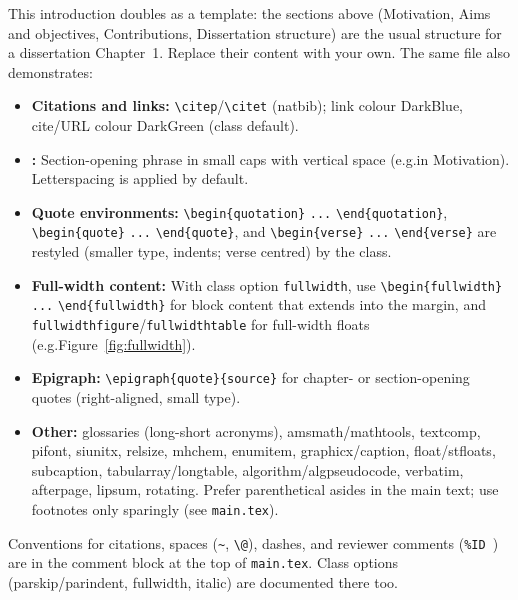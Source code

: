     This introduction doubles as a template: the sections above (Motivation, Aims and objectives, Contributions, Dissertation structure) are the usual structure for a dissertation Chapter~1. Replace their content with your own. The same file also demonstrates:

    \begin{itemize}
        \item \textbf{Citations and links:} \verb|\citep|/\verb|\citet| (natbib); link colour DarkBlue, cite/URL colour DarkGreen (class default).
      \item \textbf{\texttt{\string\newthought}:} Section-opening phrase in small caps with vertical space (e.g.\@ in Motivation). Letterspacing is applied by default.
        \item \textbf{Quote environments:} \verb|\begin{quotation}| \verb|...| \verb|\end{quotation}|, \verb|\begin{quote}| \verb|...| \verb|\end{quote}|, and \verb|\begin{verse}| \verb|...| \verb|\end{verse}| are restyled (smaller type, indents; verse centred) by the class.
        \item \textbf{Full-width content:} With class option \texttt{fullwidth}, use \verb|\begin{fullwidth}| \verb|...| \verb|\end{fullwidth}| for block content that extends into the margin, and \texttt{fullwidthfigure}/\texttt{fullwidthtable} for full-width floats (e.g.\@ Figure~\ref{fig:fullwidth}).
        \item \textbf{Epigraph:} \verb|\epigraph{quote}{source}| for chapter- or section-opening quotes (right-aligned, small type).
      \item \textbf{Other:} glossaries (long-short acronyms), amsmath/mathtools, textcomp, pifont, siunitx, relsize, mhchem, enumitem, graphicx/caption, float/stfloats, subcaption, tabularray/longtable, algorithm/algpseudocode, verbatim, afterpage, lipsum, rotating. Prefer parenthetical asides in the main text; use footnotes only sparingly (see \texttt{main.tex}).
    \end{itemize}

    Conventions for citations, spaces (\verb|~|, \verb|\@|), dashes, and reviewer comments (\verb|%ID |) are in the comment block at the top of \texttt{main.tex}. Class options (parskip/parindent, fullwidth, italic) are documented there too.
